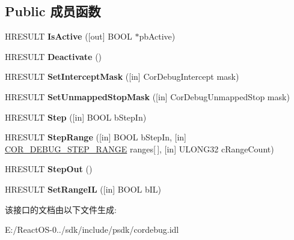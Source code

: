 \subsection*{Public 成员函数}
\begin{DoxyCompactItemize}
\item 
\mbox{\label{interface_i_cor_debug_stepper_aadf140f3a2ca94cb6689b4433fbdc4da}} 
H\+R\+E\+S\+U\+LT {\bfseries Is\+Active} (\mbox{[}out\mbox{]} B\+O\+OL $\ast$pb\+Active)
\item 
\mbox{\label{interface_i_cor_debug_stepper_a899a24a521d6b288422832cc0ff6d6e6}} 
H\+R\+E\+S\+U\+LT {\bfseries Deactivate} ()
\item 
\mbox{\label{interface_i_cor_debug_stepper_adac5b1c7dc0516b769515d477bb463d5}} 
H\+R\+E\+S\+U\+LT {\bfseries Set\+Intercept\+Mask} (\mbox{[}in\mbox{]} Cor\+Debug\+Intercept mask)
\item 
\mbox{\label{interface_i_cor_debug_stepper_abd98119cf85d0b582d080631020af755}} 
H\+R\+E\+S\+U\+LT {\bfseries Set\+Unmapped\+Stop\+Mask} (\mbox{[}in\mbox{]} Cor\+Debug\+Unmapped\+Stop mask)
\item 
\mbox{\label{interface_i_cor_debug_stepper_a9cdb5a329dd242a2f41836b03af670e5}} 
H\+R\+E\+S\+U\+LT {\bfseries Step} (\mbox{[}in\mbox{]} B\+O\+OL b\+Step\+In)
\item 
\mbox{\label{interface_i_cor_debug_stepper_a1183b979dab9e0a02ec04aa1dced6add}} 
H\+R\+E\+S\+U\+LT {\bfseries Step\+Range} (\mbox{[}in\mbox{]} B\+O\+OL b\+Step\+In, \mbox{[}in\mbox{]} \hyperlink{struct_i_cor_debug_stepper_1_1_c_o_r___d_e_b_u_g___s_t_e_p___r_a_n_g_e}{C\+O\+R\+\_\+\+D\+E\+B\+U\+G\+\_\+\+S\+T\+E\+P\+\_\+\+R\+A\+N\+GE} ranges\mbox{[}$\,$\mbox{]}, \mbox{[}in\mbox{]} U\+L\+O\+N\+G32 c\+Range\+Count)
\item 
\mbox{\label{interface_i_cor_debug_stepper_acd94035f35cf7c43dbadbbd1652b8d6a}} 
H\+R\+E\+S\+U\+LT {\bfseries Step\+Out} ()
\item 
\mbox{\label{interface_i_cor_debug_stepper_a1c7711fa588d3927c1f35dc5ce77da82}} 
H\+R\+E\+S\+U\+LT {\bfseries Set\+Range\+IL} (\mbox{[}in\mbox{]} B\+O\+OL b\+IL)
\end{DoxyCompactItemize}


该接口的文档由以下文件生成\+:\begin{DoxyCompactItemize}
\item 
E\+:/\+React\+O\+S-\/0../sdk/include/psdk/cordebug.\+idl\end{DoxyCompactItemize}

